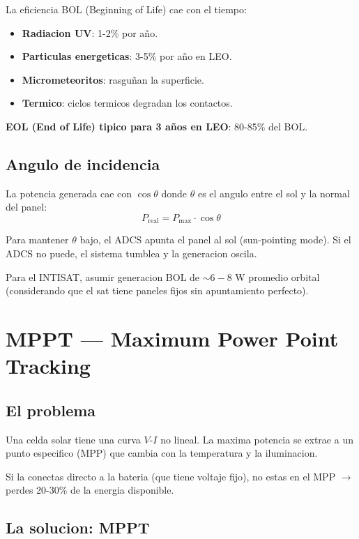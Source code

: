 \documentclass[11pt,a4paper,oneside,openright]{book}
\begin{document}
La eficiencia BOL (Beginning of Life) cae con el tiempo:

\begin{itemize}[leftmargin=2em]
  \item \textbf{Radiacion UV}: 1-2\% por año.
  \item \textbf{Particulas energeticas}: 3-5\% por año en LEO.
  \item \textbf{Micrometeoritos}: rasguñan la superficie.
  \item \textbf{Termico}: ciclos termicos degradan los contactos.
\end{itemize}

\textbf{EOL (End of Life) tipico para 3 años en LEO}: 80-85\% del BOL.

\section{Angulo de incidencia}

La potencia generada cae con $\cos\theta$ donde $\theta$ es el angulo
entre el sol y la normal del panel:
\[
P_{\text{real}} = P_{\text{max}} \cdot \cos\theta
\]

Para mantener $\theta$ bajo, el ADCS apunta el panel al sol (sun-pointing
mode). Si el ADCS no puede, el sistema tumblea y la generacion oscila.

\begin{payload}
Para el INTISAT, asumir generacion BOL de $\sim 6-8$ W promedio orbital
(considerando que el sat tiene paneles fijos sin apuntamiento perfecto).
\end{payload}

\chapter{MPPT --- Maximum Power Point Tracking}

\section{El problema}

Una celda solar tiene una curva $V$-$I$ no lineal. La maxima potencia se
extrae a un punto especifico (MPP) que cambia con la temperatura y la
iluminacion.

Si la conectas directo a la bateria (que tiene voltaje fijo), no estas
en el MPP $\to$ perdes 20-30\% de la energia disponible.

\section{La solucion: MPPT}
\end{document}
